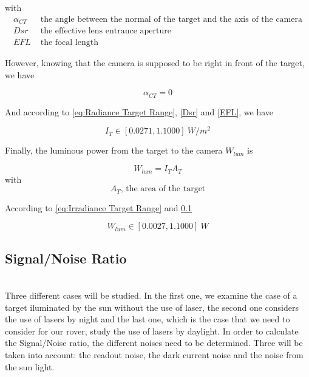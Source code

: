 with
\begin{align*}
\alpha_{CT} & \mbox{ the angle between the normal of the target and the axis of the camera} \\
Dsr & \mbox{ the effective lens entrance aperture} \\
EFL & \mbox{ the focal length}
\end{align*}

However, knowing that the camera is supposed to be right in front of the target, we have

\begin{equation*}
\alpha_{CT} = 0
\end{equation*}

And according to \eqref{eq:Radiance Target Range}, \ref{Dsr} and \ref{EFL}, we have

\begin{equation}
\label{eq:Irradiance Target Range}
I_T \in [0.0271, 1.1000] \ W/m^2
\end{equation}

Finally, the luminous power from the target to the camera $W_{lum}$ is 

\begin{equation}
\label{eq:Luminous Power}
W_{lum} = I_TA_T
\end{equation}
with
\begin{equation*}
A_T \mbox{, the area of the target}
\end{equation*}

According to \eqref{eq:Irradiance Target Range} and \ref{}

\begin{equation}
\label{eq:Luminous Power Range}
W_{lum} \in [0.0027, 1.1000] \ W
\end{equation}

\subsection{Signal/Noise Ratio}
~\\
Three different cases will be studied. In the first one, we examine the case of a target iluminated by the sun without the use of laser, the second one considers the use of lasers by night and the last one, which is the case that we need to consider for our rover, study the use of lasers by daylight.
In order to calculate the Signal/Noise ratio, the different noises need to be determined. Three will be taken into account: the readout noise, the dark current noise and the noise from the sun light. 

